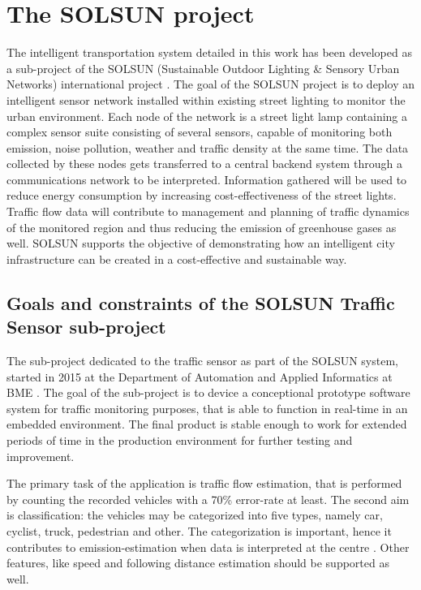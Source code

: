 \section{The SOLSUN project}
The intelligent transportation system detailed in this work has been developed as a sub-project of the SOLSUN (Sustainable Outdoor Lighting \& Sensory Urban Networks) international project \cite{SOLSUN}.
The goal of the SOLSUN project is to deploy an intelligent sensor network installed within existing street lighting to monitor the urban environment.
Each node of the network is a street light lamp containing a complex sensor suite consisting of several sensors, capable of monitoring both emission, noise pollution, weather and traffic density at the same time.
The data collected by these nodes gets transferred to a central backend system through a communications network to be interpreted.
Information gathered will be used to reduce energy consumption by increasing cost-effectiveness of the street lights.
Traffic flow data will contribute to management and planning of traffic dynamics of the monitored region and thus reducing the emission of greenhouse gases as well.
SOLSUN supports the objective of demonstrating how an intelligent city infrastructure can be created in a cost-effective and sustainable way.

\subsection{Goals and constraints of the SOLSUN Traffic Sensor sub-project}\label{sec:constraints}
The sub-project dedicated to the traffic sensor as part of the SOLSUN system, started in 2015 at the Department of Automation and Applied Informatics at BME \cite{SOLSUN_BME}.
The goal of the sub-project is to device a conceptional prototype software system for traffic monitoring purposes, that is able to function in real-time in an embedded environment.
The final product is stable enough to work for extended periods of time in the production environment for further testing and improvement.

The primary task of the application is traffic flow estimation, that is performed by counting the recorded vehicles with a 70\% error-rate at least.
The second aim is classification: the vehicles may be categorized into five types, namely car, cyclist, truck, pedestrian and other.
The categorization is important, hence it contributes to emission-estimation when data is interpreted at the centre \cite{Csorba2016}.
Other features, like speed and following distance estimation should be supported as well.

